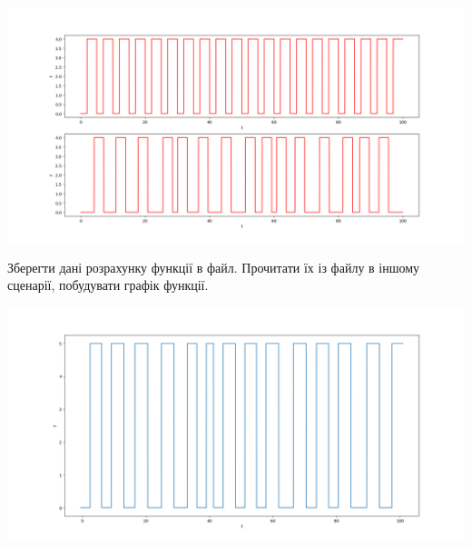 \documentclass[a4paper,12pt]{article}
\begin{document}
\begin{center}
\includegraphics[height = 13 cm,width=16 cm]{6.3.png}
\end{center}



\begin{center}
\textbf{}\par
\end{center}
Зберегти дані розрахунку функції в файл. Прочитати їх із файлу в іншому сценарії, побудувати графік функції.\par


\begin{center}
{\includegraphics[height = 10 cm,width=13 cm]{7.png} }\\
\end{center}
\end{document}
